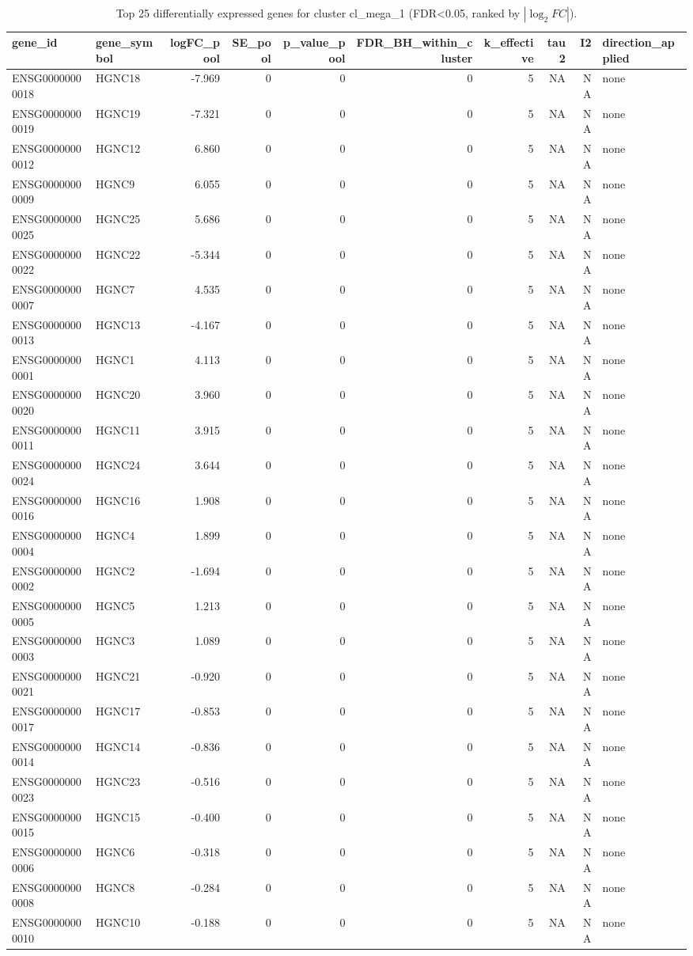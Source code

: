 \begin{table}

\caption{\label{tab:tab:top-genes-cl-mega-1}Top 25 differentially expressed genes for cluster cl_mega_1 (FDR<0.05, ranked by $|\log_2 FC|$).}
\centering
\begin{tabular}[t]{llrrrrrrrl}
\toprule
gene\_id & gene\_symbol & logFC\_pool & SE\_pool & p\_value\_pool & FDR\_BH\_within\_cluster & k\_effective & tau2 & I2 & direction\_applied\\
\midrule
ENSG00000000018 & HGNC18 & -7.969 & 0 & 0 & 0 & 5 & NA & NA & none\\
ENSG00000000019 & HGNC19 & -7.321 & 0 & 0 & 0 & 5 & NA & NA & none\\
ENSG00000000012 & HGNC12 & 6.860 & 0 & 0 & 0 & 5 & NA & NA & none\\
ENSG00000000009 & HGNC9 & 6.055 & 0 & 0 & 0 & 5 & NA & NA & none\\
ENSG00000000025 & HGNC25 & 5.686 & 0 & 0 & 0 & 5 & NA & NA & none\\
\addlinespace
ENSG00000000022 & HGNC22 & -5.344 & 0 & 0 & 0 & 5 & NA & NA & none\\
ENSG00000000007 & HGNC7 & 4.535 & 0 & 0 & 0 & 5 & NA & NA & none\\
ENSG00000000013 & HGNC13 & -4.167 & 0 & 0 & 0 & 5 & NA & NA & none\\
ENSG00000000001 & HGNC1 & 4.113 & 0 & 0 & 0 & 5 & NA & NA & none\\
ENSG00000000020 & HGNC20 & 3.960 & 0 & 0 & 0 & 5 & NA & NA & none\\
\addlinespace
ENSG00000000011 & HGNC11 & 3.915 & 0 & 0 & 0 & 5 & NA & NA & none\\
ENSG00000000024 & HGNC24 & 3.644 & 0 & 0 & 0 & 5 & NA & NA & none\\
ENSG00000000016 & HGNC16 & 1.908 & 0 & 0 & 0 & 5 & NA & NA & none\\
ENSG00000000004 & HGNC4 & 1.899 & 0 & 0 & 0 & 5 & NA & NA & none\\
ENSG00000000002 & HGNC2 & -1.694 & 0 & 0 & 0 & 5 & NA & NA & none\\
\addlinespace
ENSG00000000005 & HGNC5 & 1.213 & 0 & 0 & 0 & 5 & NA & NA & none\\
ENSG00000000003 & HGNC3 & 1.089 & 0 & 0 & 0 & 5 & NA & NA & none\\
ENSG00000000021 & HGNC21 & -0.920 & 0 & 0 & 0 & 5 & NA & NA & none\\
ENSG00000000017 & HGNC17 & -0.853 & 0 & 0 & 0 & 5 & NA & NA & none\\
ENSG00000000014 & HGNC14 & -0.836 & 0 & 0 & 0 & 5 & NA & NA & none\\
\addlinespace
ENSG00000000023 & HGNC23 & -0.516 & 0 & 0 & 0 & 5 & NA & NA & none\\
ENSG00000000015 & HGNC15 & -0.400 & 0 & 0 & 0 & 5 & NA & NA & none\\
ENSG00000000006 & HGNC6 & -0.318 & 0 & 0 & 0 & 5 & NA & NA & none\\
ENSG00000000008 & HGNC8 & -0.284 & 0 & 0 & 0 & 5 & NA & NA & none\\
ENSG00000000010 & HGNC10 & -0.188 & 0 & 0 & 0 & 5 & NA & NA & none\\
\bottomrule
\end{tabular}
\end{table}
